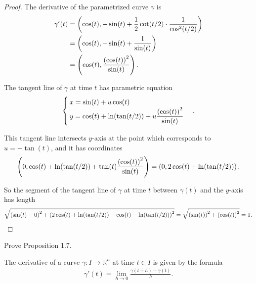 \begin{proof}
	The derivative of the parametrized curve $\gamma$ is
	\begin{align*}
		\gamma'(t) & = \left({ \cos(t), -\sin(t) + \frac{1}{2}\cot(t/2)\cdot\frac{1}{\cos^{2}(t/2)} }\right) \\
		           & = \left({ \cos(t), -\sin(t) + \frac{1}{\sin(t)} }\right)                                \\
		           & = \left({ \cos(t), \frac{\left({\cos(t)}\right)^{2}}{\sin(t)} }\right).
	\end{align*}

	The tangent line of $\gamma$ at time $t$ has parametric equation
	\begin{align*}
		\begin{cases}
			x = \sin(t) + u\cos(t) \\
			y = \cos(t) + \ln(\tan(t/2)) + u\dfrac{\left({\cos(t)}\right)^{2}}{\sin(t)}
		\end{cases}.
	\end{align*}

	This tangent line intersects $y$-axis at the point which corresponds to $u = -\tan(t)$, and it has coordinates
	\begin{align*}
		\left({0, \cos(t) + \ln(\tan(t/2)) + \tan(t)\frac{\left({\cos(t)}\right)^{2}}{\sin(t)}}\right) = \left({0, 2\cos(t) + \ln(\tan(t/2))}\right).
	\end{align*}

	So the segment of the tangent line of $\gamma$ at time $t$ between $\gamma(t)$ and the $y$-axis has length
	\begin{align*}
		\sqrt{\left({\sin(t) - 0}\right)^{2} + \left({2\cos(t) + \ln(\tan(t/2)) - \cos(t) - \ln(\tan(t/2))}\right)^{2}} = \sqrt{\left({\sin(t)}\right)^{2} + \left({\cos(t)}\right)^{2}} = 1.
	\end{align*}
\end{proof}

\begin{exercise}{1.5}
	Prove Proposition 1.7.

	The derivative of a curve $\gamma: I\to \mathbb{R}^{n}$ at time $t\in I$ is given by the formula
	\begin{align*}
		\gamma'(t) = \lim\limits_{h\to 0} \frac{\gamma(t + h) - \gamma(t)}{h}.
	\end{align*}
\end{exercise}

